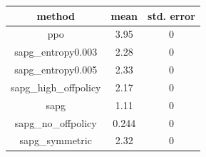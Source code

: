 \begin{tabular}{|c|c|c|}
\hline method & mean & std. error \\
\hline
ppo & 3.95 & 0 \\
sapg_entropy0.003 & 2.28 & 0 \\
sapg_entropy0.005 & 2.33 & 0 \\
sapg_high_offpolicy & 2.17 & 0 \\
sapg & 1.11 & 0 \\
sapg_no_offpolicy & 0.244 & 0 \\
sapg_symmetric & 2.32 & 0 \\
\hline
\end{tabular}

